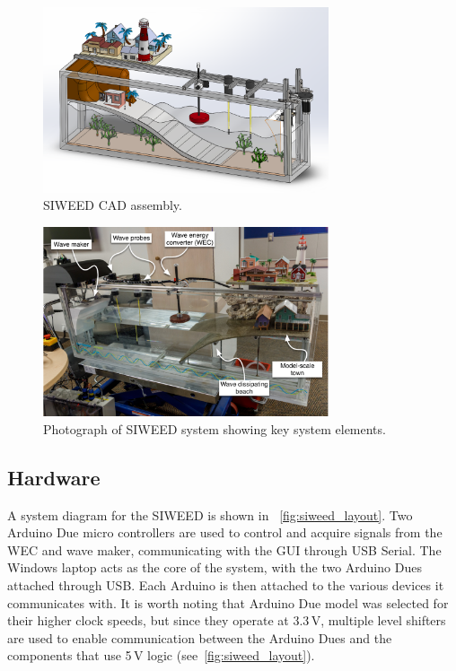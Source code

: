 \documentclass[11pt, letterpaper]{article}
\begin{document}
\begin{figure}[tb]
  \centering
  \includegraphics[width=0.75\textwidth]{diagrams/SIWEED_CAD.png}
  \caption{SIWEED CAD assembly.}
  \label{fig:CAD}
\end{figure}

\begin{figure}[tb]
  \centering
  \includegraphics[width=0.75\textwidth]{diagrams/siweed_photo_with_callouts.pdf}
  \caption{Photograph of SIWEED system showing key system elements.}
  \label{fig:siweed_photo_with_callouts}
\end{figure}

\subsection{Hardware}
A system diagram for the SIWEED is shown in \figurename~\ref{fig:siweed_layout}.
Two Arduino Due micro controllers are used to control and acquire signals from the WEC and wave maker, communicating with the GUI through USB Serial.
The Windows laptop acts as the core of the system, with the two Arduino Dues attached through USB. 
Each Arduino is then attached to the various devices it communicates with.
It is worth noting that Arduino Due model was selected for their higher clock speeds, but since they operate at 3.3\,V, multiple level shifters are used to enable communication between the Arduino Dues and the components that use 5\,V logic (see\figurename~\ref{fig:siweed_layout}).
\end{document}

